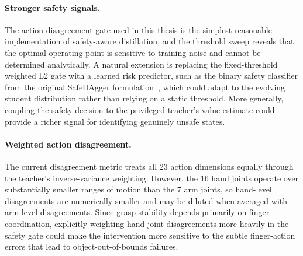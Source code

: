 \paragraph{Stronger safety signals.}
The action-disagreement gate used in this thesis is the simplest reasonable implementation of safety-aware distillation, and the threshold sweep reveals that the optimal operating point is sensitive to training noise and cannot be determined analytically.
A natural extension is replacing the fixed-threshold weighted L2 gate with a learned risk predictor, such as the binary safety classifier from the original SafeDAgger formulation~\cite{Zhang2016}, which could adapt to the evolving student distribution rather than relying on a static threshold.
More generally, coupling the safety decision to the privileged teacher's value estimate could provide a richer signal for identifying genuinely unsafe states.

\paragraph{Weighted action disagreement.}
The current disagreement metric treats all 23 action dimensions equally through the teacher's inverse-variance weighting.
However, the 16 hand joints operate over substantially smaller ranges of motion than the 7 arm joints, so hand-level disagreements are numerically smaller and may be diluted when averaged with arm-level disagreements.
Since grasp stability depends primarily on finger coordination, explicitly weighting hand-joint disagreements more heavily in the safety gate could make the intervention more sensitive to the subtle finger-action errors that lead to object-out-of-bounds failures.
%
